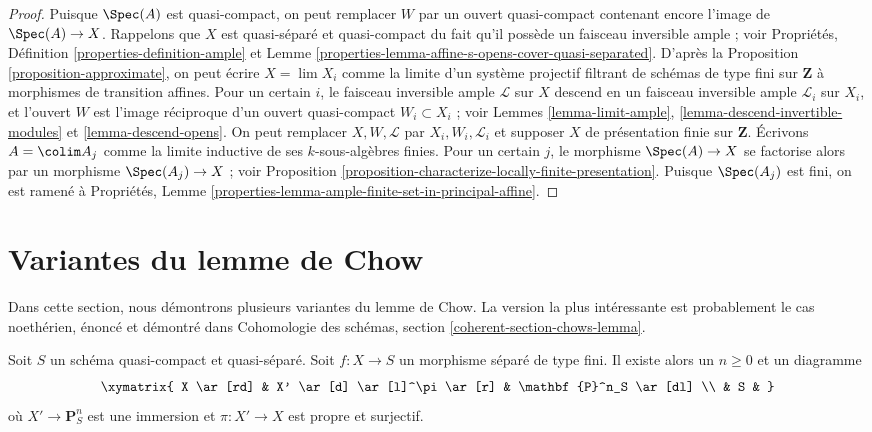 \begin{proof}
Puisque $\Spec(A)$ est quasi-compact, on peut remplacer $W$ par un ouvert
quasi-compact contenant encore l'image de $\Spec(A) \to X$.
Rappelons que $X$ est quasi-séparé et quasi-compact du fait
qu'il possède un faisceau inversible ample ; voir
Propriétés, Définition \ref{properties-definition-ample} et
Lemme \ref{properties-lemma-affine-s-opens-cover-quasi-separated}.
D'après la Proposition \ref{proposition-approximate}, on peut
écrire $X = \lim X_i$ comme la limite d'un système projectif filtrant
de schémas de type fini sur $\mathbf{Z}$
à morphismes de transition affines.
Pour un certain $i$, le faisceau inversible ample $\mathcal{L}$ sur $X$
descend en un faisceau inversible ample $\mathcal{L}_i$ sur $X_i$,
et l'ouvert $W$ est l'image réciproque d'un ouvert
quasi-compact $W_i \subset X_i$ ; voir
Lemmes \ref{lemma-limit-ample}, \ref{lemma-descend-invertible-modules} et
\ref{lemma-descend-opens}.
On peut remplacer $X, W, \mathcal{L}$ par $X_i, W_i, \mathcal{L}_i$
et supposer $X$ de présentation finie sur $\mathbf{Z}$.
Écrivons $A = \colim A_j$ comme la limite inductive de ses $k$-sous-algèbres finies.
Pour un certain $j$, le morphisme $\Spec(A) \to X$ se factorise alors par
un morphisme $\Spec(A_j) \to X$ ; voir
Proposition \ref{proposition-characterize-locally-finite-presentation}.
Puisque $\Spec(A_j)$ est fini, on est ramené à
Propriétés, Lemme \ref{properties-lemma-ample-finite-set-in-principal-affine}.
\end{proof}



















\section{Variantes du lemme de Chow}
\label{section-chows-lemma}

\noindent
Dans cette section, nous démontrons plusieurs variantes du lemme de Chow.
La version la plus intéressante est probablement le cas noethérien,
énoncé et démontré dans
Cohomologie des schémas, section \ref{coherent-section-chows-lemma}.

\begin{lemma}
\label{lemma-chow-finite-type}
Soit $S$ un schéma quasi-compact et quasi-séparé.
Soit $f : X \to S$ un morphisme séparé de type fini.
Il existe alors un $n \geq 0$ et un diagramme
$$
\xymatrix{
X \ar[rd] & X' \ar[d] \ar[l]^\pi \ar[r] & \mathbf{P}^n_S \ar[dl] \\
& S &
}
$$
où $X' \to \mathbf{P}^n_S$ est une immersion et
$\pi : X' \to X$ est propre et surjectif.
\end{lemma}

